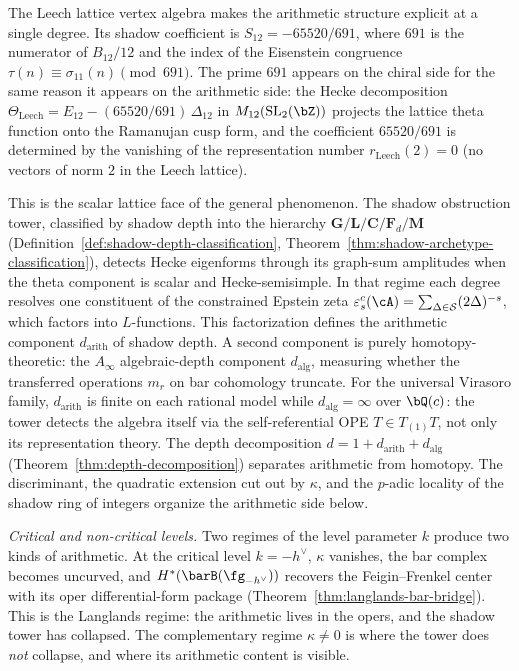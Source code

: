 The Leech lattice vertex algebra makes the arithmetic
structure explicit at a single degree. Its shadow
coefficient is $S_{12} = -65520/691$, where $691$ is
the numerator of $B_{12}/12$ and the index of the
Eisenstein congruence $\tau(n) \equiv \sigma_{11}(n)
\pmod{691}$. The prime $691$ appears on the chiral
side for the same reason it appears on the arithmetic
side: the Hecke decomposition
$\Theta_{\mathrm{Leech}} = E_{12} - (65520/691)\,\Delta_{12}$
in $M_{12}(\mathrm{SL}_2(\bZ))$ projects the lattice theta
function onto the Ramanujan cusp form, and the coefficient
$65520/691$ is determined by the vanishing of the
representation number $r_{\mathrm{Leech}}(2) = 0$ (no vectors
of norm $2$ in the Leech lattice).

This is the scalar lattice face of the general phenomenon. The shadow
obstruction tower, classified by shadow depth into the hierarchy
$\mathbf{G}/\mathbf{L}/\mathbf{C}/\mathbf{F}_d/\mathbf{M}$
(Definition~\ref{def:shadow-depth-classification},
Theorem~\ref{thm:shadow-archetype-classification}), detects Hecke
eigenforms through its graph-sum amplitudes when the theta component
is scalar and Hecke-semisimple. In that regime each degree resolves
one constituent of the constrained Epstein zeta
$\varepsilon^c_s(\cA) = \sum_{\Delta \in \mathcal{S}}(2\Delta)^{-s}$,
which factors into $L$-functions. This factorization defines the
arithmetic component $d_{\mathrm{arith}}$ of shadow depth.
A second component is purely homotopy-theoretic: the $A_\infty$
algebraic-depth component $d_{\mathrm{alg}}$, measuring whether the
transferred operations $m_r$ on bar cohomology truncate.
For the universal Virasoro family, $d_{\mathrm{arith}}$ is finite on
each rational model while $d_{\mathrm{alg}}=\infty$ over $\bQ(c)$: the
tower detects the algebra itself via the self-referential OPE
$T \in T_{(1)} T$, not only its representation theory. The depth
decomposition
$d = 1 + d_{\mathrm{arith}} + d_{\mathrm{alg}}$
(Theorem~\ref{thm:depth-decomposition}) separates arithmetic
from homotopy. The discriminant, the quadratic extension
cut out by $\kappa$, and the $p$-adic locality of the
shadow ring of integers organize the arithmetic side below.

\smallskip
\noindent\emph{Critical and non-critical levels.}\;
Two regimes of the level parameter $k$ produce two
kinds of arithmetic. At the critical level $k = -h^\vee$,
$\kappa$ vanishes, the bar complex becomes
uncurved, and $H^*(\barB(\fg_{-h^\vee}))$
recovers the Feigin--Frenkel center with its oper
differential-form package
(Theorem~\ref{thm:langlands-bar-bridge}).
This is the Langlands regime: the arithmetic lives in the
opers, and the shadow tower has collapsed.
The complementary regime $\kappa \ne 0$ is where the
tower does \emph{not} collapse, and where its arithmetic
content is visible.

